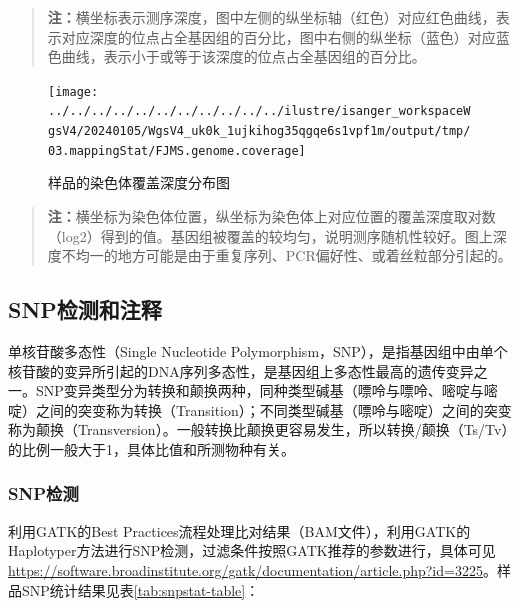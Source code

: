 \documentclass[
  a4paper,
  titlepage]{article}
\begin{document}
\begin{quote}
\textbf{注：}横坐标表示测序深度，图中左侧的纵坐标轴（红色）对应红色曲线，表示对应深度的位点占全基因组的百分比，图中右侧的纵坐标（蓝色）对应蓝色曲线，表示小于或等于该深度的位点占全基因组的百分比。
\end{quote}

\begin{figure}[H]

{\centering \texttt{[image: ../../../../../../../../../../../ilustre/isanger\_workspaceWgsV4/20240105/WgsV4\_uk0k\_1ujkihog35qgqe6s1vpf1m/output/tmp/03.mappingStat/FJMS.genome.coverage]} 

}

\caption{样品的染色体覆盖深度分布图}\label{fig:genomecoverage-plot}
\end{figure}

\begin{quote}
\textbf{注：}横坐标为染色体位置，纵坐标为染色体上对应位置的覆盖深度取对数（log2）得到的值。基因组被覆盖的较均匀，说明测序随机性较好。图上深度不均一的地方可能是由于重复序列、PCR偏好性、或着丝粒部分引起的。
\end{quote}

\hypertarget{snpux68c0ux6d4bux548cux6ce8ux91ca}{%
\subsection{SNP检测和注释}\label{snpux68c0ux6d4bux548cux6ce8ux91ca}}

单核苷酸多态性（Single Nucleotide Polymorphism，SNP），是指基因组中由单个核苷酸的变异所引起的DNA序列多态性，是基因组上多态性最高的遗传变异之一。SNP变异类型分为转换和颠换两种，同种类型碱基（嘌呤与嘌呤、嘧啶与嘧啶）之间的突变称为转换（Transition）；不同类型碱基（嘌呤与嘧啶）之间的突变称为颠换（Transversion）。一般转换比颠换更容易发生，所以转换/颠换（Ts/Tv）的比例一般大于1，具体比值和所测物种有关。

\hypertarget{snpux68c0ux6d4b}{%
\subsubsection{SNP检测}\label{snpux68c0ux6d4b}}

利用GATK的Best Practices流程处理比对结果（BAM文件），利用GATK的Haplotyper方法进行SNP检测，过滤条件按照GATK推荐的参数进行，具体可见\url{https://software.broadinstitute.org/gatk/documentation/article.php?id=3225}。样品SNP统计结果见表\ref{tab:snpstat-table}：
\end{document}
